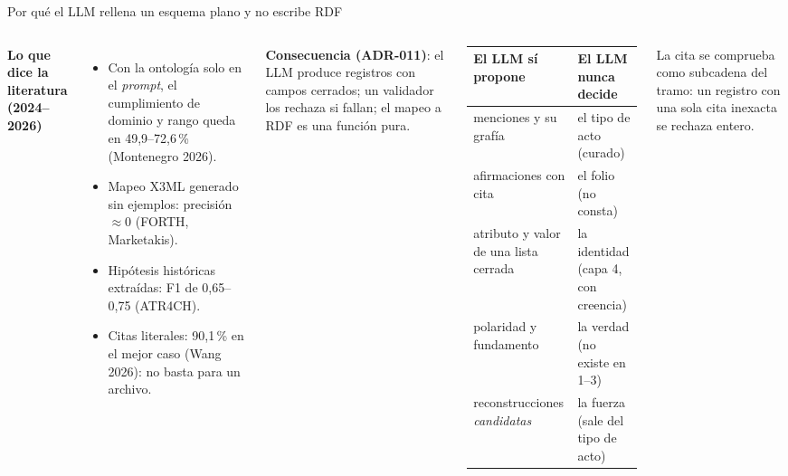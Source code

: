 \documentclass[aspectratio=169,10pt]{beamer}
\begin{document}
\begin{frame}{Por qué el LLM rellena un esquema plano y no escribe RDF}
\begin{columns}[T]
\small
\textbf{Lo que dice la literatura (2024--2026)}
\begin{itemize}\footnotesize
\item Con la ontología solo en el \emph{prompt}, el cumplimiento de dominio y rango queda en
      \alert{49,9--72,6\,\%} (Montenegro 2026).
\item Mapeo X3ML generado sin ejemplos: precisión $\approx$\alert{0} (FORTH, Marketakis).
\item Hipótesis históricas extraídas: F1 de \alert{0,65--0,75} (ATR4CH).
\item Citas literales: \alert{90,1\,\%} en el mejor caso (Wang 2026): no basta para un archivo.
\end{itemize}
\textbf{Consecuencia (ADR-011)}: el LLM produce registros con campos cerrados; un validador los rechaza si fallan; el
mapeo a RDF es una función pura.
\footnotesize
\begin{tabular}{@{}p{2.4cm}p{2.9cm}@{}}
\toprule
El LLM sí propone & El LLM \alert{nunca} decide \\
\midrule
menciones y su grafía & el tipo de acto (curado) \\
afirmaciones con cita & el folio (no consta) \\
atributo y valor de una lista cerrada & la identidad (capa 4, con creencia) \\
polaridad y fundamento & la verdad (no existe en 1--3) \\
reconstrucciones \emph{candidatas} & la fuerza (sale del tipo de acto) \\
\bottomrule
\end{tabular}

\medskip
La cita se comprueba como subcadena del tramo: un registro con una sola cita inexacta se rechaza entero.
\end{columns}
\end{frame}
\end{document}
